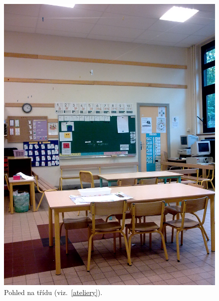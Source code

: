 	\begin{figure}[tb]
		\centering
		\includegraphics[height=0.35\textheight]{./fotky/Obr14.jpg}
		\caption{
			Pohled na třídu (viz.~\ref{ateliery}).
		}
		\label{Obr14}
	\end{figure}

